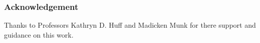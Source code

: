 \begin{frame}
  \frametitle{Acknowledgement}
  Thanks to Professors Kathryn D. Huff and Madicken Munk for there support and guidance on this work.
\end{frame}
